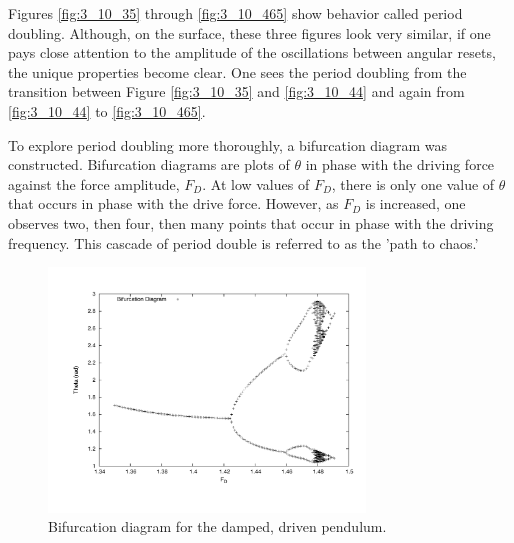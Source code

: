 \documentclass[12pt]{article}
\begin{document}
Figures \ref{fig:3_10_35} through \ref{fig:3_10_465} show behavior called period doubling.  Although, on the surface, these three figures look very similar, if one pays close attention to the amplitude of the oscillations between angular resets, the unique properties become clear.  One sees the period doubling from the transition between Figure \ref{fig:3_10_35} and \ref{fig:3_10_44} and again from \ref{fig:3_10_44} to \ref{fig:3_10_465}.

To explore period doubling more thoroughly, a bifurcation diagram was constructed.  Bifurcation diagrams are plots of $\theta$ in phase with the driving force against the force amplitude, $F_D$.  At low values of $F_D$, there is only one value of $\theta$ that occurs in phase with the drive force.  However, as $F_D$ is increased, one observes two, then four, then many points that occur in phase with the driving frequency.  This cascade of period double is referred to as the 'path to chaos.'
\begin{figure}[!h]
\centering
\includegraphics[width =110 mm, height = 65mm]{Fig_3_11.pdf}
\caption{Bifurcation diagram for the damped, driven pendulum.}
\label{fig:3_11}
\end{figure}
\end{document}

